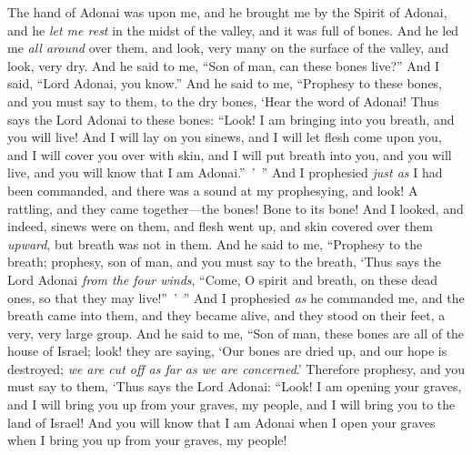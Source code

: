 \begin{biblechapter} %
 The hand of Adonai was upon me, and he brought me by the Spirit of Adonai, and he \textit{let me rest} in the midst of the valley, and it was full of bones.
\verse And he led me \textit{all around} over them, and look, very many on the surface of the valley, and look, very dry.
\verse And he said to me, “Son of man, can these bones live?” And I said, “Lord Adonai, you know.”
\verse And he said to me, “Prophesy to these bones, and you must say to them, to the dry bones, ‘Hear the word of Adonai!
\verse Thus says the Lord Adonai to these bones: “Look! I am bringing into you breath, and you will live!
\verse And I will lay on you sinews, and I will let flesh come upon you, and I will cover you over with skin, and I will put breath into you, and you will live, and you will know that I am Adonai.” ’ ”
\verse And I prophesied \textit{just as} I had been commanded, and there was a sound at my prophesying, and look! A rattling, and they came together—the bones! Bone to its bone!
\verse And I looked, and indeed, sinews were on them, and flesh went up, and skin covered over them \textit{upward}, but breath was not in them.
\verse And he said to me, “Prophesy to the breath; prophesy, son of man, and you must say to the breath, ‘Thus says the Lord Adonai \textit{from the four winds}, “Come, O spirit and breath, on these dead ones, so that they may live!” ’ ”
\verse And I prophesied \textit{as} he commanded me, and the breath came into them, and they became alive, and they stood on their feet, a very, very large group.
\verse And he said to me, “Son of man, these bones are all of the house of Israel; look! they are saying, ‘Our bones are dried up, and our hope is destroyed; \textit{we are cut off as far as we are concerned}.’
\verse Therefore prophesy, and you must say to them, ‘Thus says the Lord Adonai: “Look! I am opening your graves, and I will bring you up from your graves, my people, and I will bring you to the land of Israel!
\verse And you will know that I am Adonai when I open your graves when I bring you up from your graves, my people!

\end{biblechapter}
